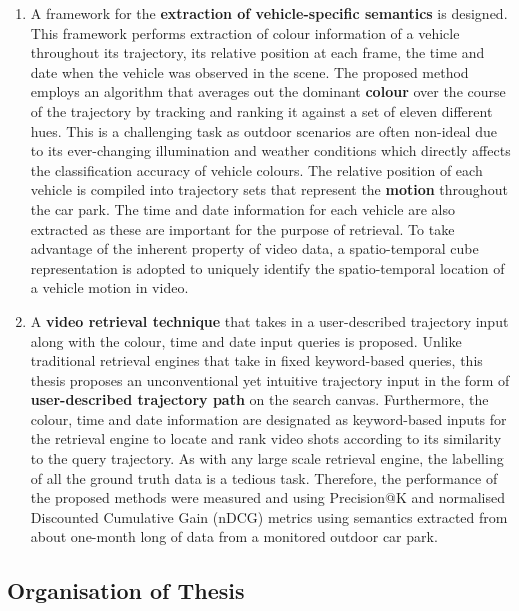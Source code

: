 \begin{enumerate}
\item A framework for the \textbf{extraction of vehicle-specific semantics} is designed. This framework performs extraction of colour information of a vehicle throughout its trajectory, its relative position %
at each frame, the time and date when the vehicle was observed in the scene.
The proposed method employs an algorithm that averages out the dominant \textbf{colour} over the course of the trajectory by tracking and ranking it against a set of eleven different hues. This is a challenging task as outdoor scenarios are often non-ideal due to its ever-changing illumination and weather conditions which directly affects the classification accuracy of vehicle colours. The relative position of each vehicle is compiled into trajectory sets that represent the \textbf{motion} throughout the car park. The time and date information for each vehicle are also extracted as these %
are important for the purpose of retrieval. To take advantage of the inherent property of video data, a spatio-temporal cube representation is adopted to uniquely identify the spatio-temporal location of a vehicle motion in video.
\item A \textbf{video retrieval technique} that takes in a user-described
  trajectory input along with the colour, time and date input queries is proposed. Unlike traditional retrieval engines that take in %
fixed
keyword-based queries, this thesis proposes an unconventional yet intuitive trajectory input in the form of \textbf{user-described trajectory path} on the search canvas. Furthermore, the colour, time and date information are designated as keyword-based inputs for the retrieval engine to locate and rank video shots according to its similarity to the query trajectory. As with any large scale retrieval engine, the labelling of all the ground truth data is a tedious task. %
Therefore, the performance of the proposed methods were measured and using Precision@K and normalised Discounted Cumulative Gain (nDCG) metrics using semantics extracted from about one-month long of data from a monitored outdoor car park.
\end{enumerate}

\vspace{1em}
\subsection{Organisation of Thesis}

